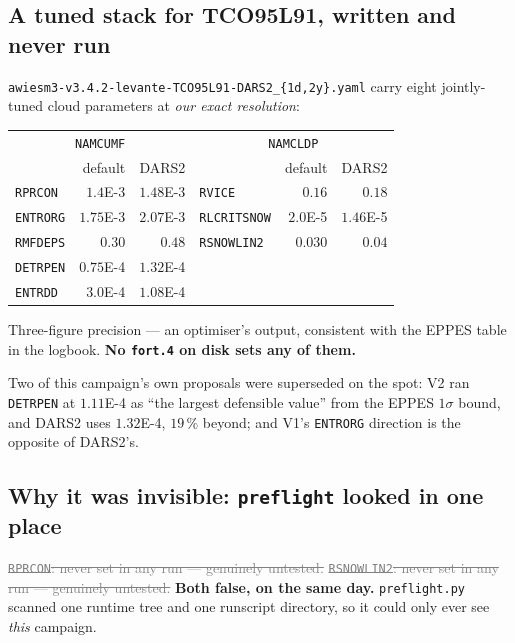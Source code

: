 \documentclass[10pt]{article}
\newcommand{\dead}[1]{\textcolor{gray}{\sout{#1}}}
\begin{document}
\subsection{A tuned stack for TCO95L91, written and never run}\label{sub:r27dars2}
\texttt{awiesm3-v3.4.2-levante-TCO95L91-DARS2\_\{1d,2y\}.yaml} carry eight jointly-tuned
cloud parameters at \emph{our exact resolution}:

\begin{center}\footnotesize
\begin{tabular}{l r r l r r}
\toprule
\multicolumn{3}{c}{\texttt{NAMCUMF}} & \multicolumn{3}{c}{\texttt{NAMCLDP}} \\
& default & DARS2 & & default & DARS2 \\
\midrule
\texttt{RPRCON} & $1.4$E-3 & $1.48$E-3 & \texttt{RVICE} & $0.16$ & $0.18$ \\
\texttt{ENTRORG} & $1.75$E-3 & $2.07$E-3 & \texttt{RLCRITSNOW} & $2.0$E-5 & $1.46$E-5 \\
\texttt{RMFDEPS} & $0.30$ & $0.48$ & \texttt{RSNOWLIN2} & $0.030$ & $\mathbf{0.04}$ \\
\texttt{DETRPEN} & $0.75$E-4 & $\mathbf{1.32}$E-4 & & & \\
\texttt{ENTRDD} & $3.0$E-4 & $1.08$E-4 & & & \\
\bottomrule
\end{tabular}
\end{center}

\noindent Three-figure precision --- an optimiser's output, consistent with the EPPES
table in the logbook. \textbf{No \texttt{fort.4} on disk sets any of them.}

Two of this campaign's own proposals were superseded on the spot: V2 ran \texttt{DETRPEN}
at $1.11$E-4 as ``the largest defensible value'' from the EPPES $1\sigma$ bound, and DARS2
uses $1.32$E-4, $19\,\%$ beyond; and V1's \texttt{ENTRORG} direction is the opposite of
DARS2's.

\subsection{Why it was invisible: \texttt{preflight} looked in one place}\label{sub:r27preflight}
\dead{\texttt{RPRCON}: never set in any run --- genuinely untested.}
\dead{\texttt{RSNOWLIN2}: never set in any run --- genuinely untested.}
\textbf{Both false, on the same day.} \texttt{preflight.py} scanned one runtime tree and
one runscript directory, so it could only ever see \emph{this} campaign.
\end{document}
